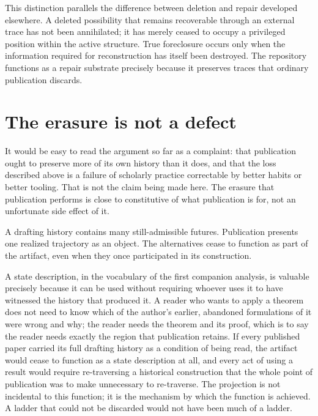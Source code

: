 \documentclass[11pt]{article}
\begin{document}
This distinction parallels the difference between deletion and repair developed elsewhere. A deleted possibility that remains recoverable through an external trace has not been annihilated; it has merely ceased to occupy a privileged position within the active structure. True foreclosure occurs only when the information required for reconstruction has itself been destroyed. The repository functions as a repair substrate precisely because it preserves traces that ordinary publication discards.

\section{The erasure is not a defect}

It would be easy to read the argument so far as a complaint: that publication ought to preserve more of its own history than it does, and that the loss described above is a failure of scholarly practice correctable by better habits or better tooling. That is not the claim being made here. The erasure that publication performs is close to constitutive of what publication is for, not an unfortunate side effect of it.

A drafting history contains many still-admissible futures. Publication presents one realized trajectory as an object. The alternatives cease to function as part of the artifact, even when they once participated in its construction.

A state description, in the vocabulary of the first companion analysis, is valuable precisely because it can be used without requiring whoever uses it to have witnessed the history that produced it. A reader who wants to apply a theorem does not need to know which of the author's earlier, abandoned formulations of it were wrong and why; the reader needs the theorem and its proof, which is to say the reader needs exactly the region that publication retains. If every published paper carried its full drafting history as a condition of being read, the artifact would cease to function as a state description at all, and every act of using a result would require re-traversing a historical construction that the whole point of publication was to make unnecessary to re-traverse. The projection is not incidental to this function; it is the mechanism by which the function is achieved. A ladder that could not be discarded would not have been much of a ladder.
\end{document}
